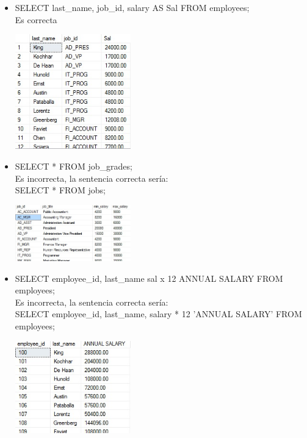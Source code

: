 \begin{itemize}
	\item SELECT last\_name, job\_id, salary AS Sal FROM employees;
	\\Es correcta
	\begin{center}
	\includegraphics[width=5cm]{./Imagenes/actividad0101} 
	\end{center}

	\item SELECT * FROM job\_grades;
	\\Es incorrecta, la sentencia correcta sería:
	\\SELECT * FROM jobs;
	\begin{center}
	\includegraphics[width=5cm]{./Imagenes/actividad0102} 
	\end{center}
	
	\item SELECT employee\_id, last\_name sal x 12 ANNUAL SALARY FROM employees;
	\\Es incorrecta, la sentencia correcta sería:
	\\SELECT employee\_id, last\_name, salary * 12 'ANNUAL SALARY' FROM employees;
	\begin{center}
	\includegraphics[width=5cm]{./Imagenes/actividad0103} 
	\end{center}

\end{itemize} 